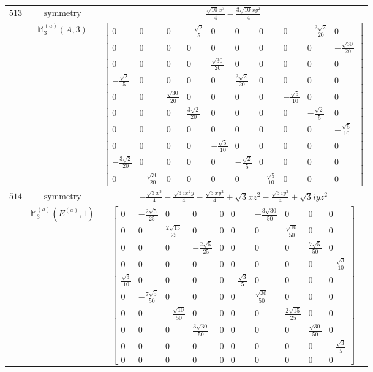 \documentclass[fleqn,8pt,landscape]{jsarticle}
\begin{document}
\begin{longtable}{ccc}
$ 513 $ & $ \text{symmetry} $ & $ \frac{\sqrt{10} x^{3}}{4} - \frac{3 \sqrt{10} x y^{2}}{4} $ \\
$  $ & $ \mathbb{M}_{3}^{(a)}(A,3) $ & $ \begin{bmatrix} 0 & 0 & 0 & - \frac{\sqrt{2}}{5} & 0 & 0 & 0 & 0 & - \frac{3 \sqrt{2}}{20} & 0 \\ 0 & 0 & 0 & 0 & 0 & 0 & 0 & 0 & 0 & - \frac{\sqrt{30}}{20} \\ 0 & 0 & 0 & 0 & \frac{\sqrt{30}}{20} & 0 & 0 & 0 & 0 & 0 \\ - \frac{\sqrt{2}}{5} & 0 & 0 & 0 & 0 & \frac{3 \sqrt{2}}{20} & 0 & 0 & 0 & 0 \\ 0 & 0 & \frac{\sqrt{30}}{20} & 0 & 0 & 0 & 0 & - \frac{\sqrt{5}}{10} & 0 & 0 \\ 0 & 0 & 0 & \frac{3 \sqrt{2}}{20} & 0 & 0 & 0 & 0 & - \frac{\sqrt{2}}{5} & 0 \\ 0 & 0 & 0 & 0 & 0 & 0 & 0 & 0 & 0 & - \frac{\sqrt{5}}{10} \\ 0 & 0 & 0 & 0 & - \frac{\sqrt{5}}{10} & 0 & 0 & 0 & 0 & 0 \\ - \frac{3 \sqrt{2}}{20} & 0 & 0 & 0 & 0 & - \frac{\sqrt{2}}{5} & 0 & 0 & 0 & 0 \\ 0 & - \frac{\sqrt{30}}{20} & 0 & 0 & 0 & 0 & - \frac{\sqrt{5}}{10} & 0 & 0 & 0 \end{bmatrix} $ \\ \hline
$ 514 $ & $ \text{symmetry} $ & $ - \frac{\sqrt{3} x^{3}}{4} - \frac{\sqrt{3} i x^{2} y}{4} - \frac{\sqrt{3} x y^{2}}{4} + \sqrt{3} x z^{2} - \frac{\sqrt{3} i y^{3}}{4} + \sqrt{3} i y z^{2} $ \\
$  $ & $ \mathbb{M}_{3}^{(a)}(E^{(a)},1) $ & $ \begin{bmatrix} 0 & - \frac{2 \sqrt{5}}{25} & 0 & 0 & 0 & 0 & - \frac{3 \sqrt{30}}{50} & 0 & 0 & 0 \\ 0 & 0 & \frac{2 \sqrt{15}}{25} & 0 & 0 & 0 & 0 & \frac{\sqrt{10}}{50} & 0 & 0 \\ 0 & 0 & 0 & - \frac{2 \sqrt{5}}{25} & 0 & 0 & 0 & 0 & \frac{7 \sqrt{5}}{50} & 0 \\ 0 & 0 & 0 & 0 & 0 & 0 & 0 & 0 & 0 & - \frac{\sqrt{3}}{10} \\ \frac{\sqrt{3}}{10} & 0 & 0 & 0 & 0 & - \frac{\sqrt{3}}{5} & 0 & 0 & 0 & 0 \\ 0 & - \frac{7 \sqrt{5}}{50} & 0 & 0 & 0 & 0 & \frac{\sqrt{30}}{50} & 0 & 0 & 0 \\ 0 & 0 & - \frac{\sqrt{10}}{50} & 0 & 0 & 0 & 0 & \frac{2 \sqrt{15}}{25} & 0 & 0 \\ 0 & 0 & 0 & \frac{3 \sqrt{30}}{50} & 0 & 0 & 0 & 0 & \frac{\sqrt{30}}{50} & 0 \\ 0 & 0 & 0 & 0 & 0 & 0 & 0 & 0 & 0 & - \frac{\sqrt{3}}{5} \\ 0 & 0 & 0 & 0 & 0 & 0 & 0 & 0 & 0 & 0 \end{bmatrix} $ \\ \hline

\end{longtable}
\end{document}
